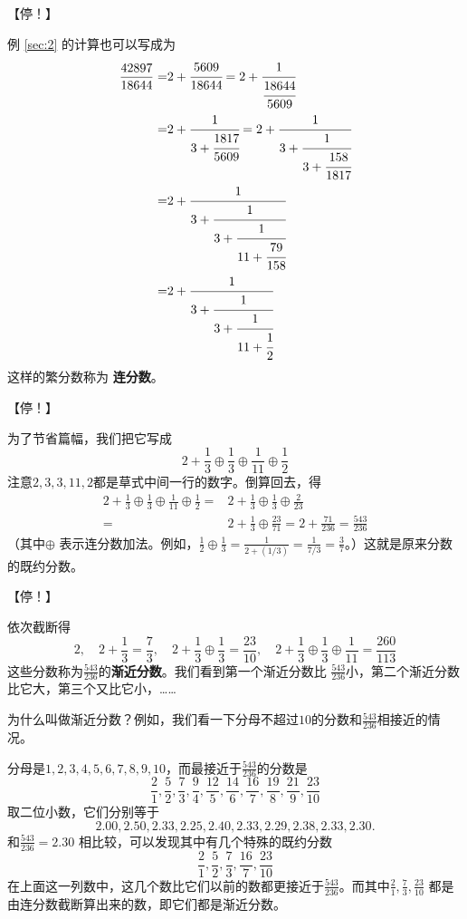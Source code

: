 \documentclass{ctexart}
\newcommand{\cplus}{\oplus}
\begin{document}
【停！】

例 \ref{sec:2} 的计算也可以写成为
\begin{align*}
  \frac{42897}{18644} = & 2 + \cfrac{5609}{18644} = 2 + \cfrac{1}{\cfrac{18644}{5609}}\\
  = & 2 + \cfrac{1}{3 + \cfrac{1817}{5609}} = 2 + \cfrac{1}{3+\cfrac{1}{3 + \cfrac{158}{1817}}}\\
  = & 2 + \cfrac{1}{3 + \cfrac{1}{3 + \cfrac{1}{11+\cfrac{79}{158}}}}\\
  = & 2 + \cfrac{1}{3 + \cfrac{1}{3 + \cfrac{1}{11+\cfrac{1}{2}}}}
\end{align*}
这样的繁分数称为 \textbf{连分数}。

【停！】

为了节省篇幅，我们把它写成
\begin{equation*}
2 + \frac{1}{3} \cplus \frac{1}{3} \cplus \frac{1}{11} \cplus \frac{1}{2}
\end{equation*}
注意$2,3,3,11,2$都是草式中间一行的数字。倒算回去，得
\begin{align*}
  2 + \frac{1}{3} \cplus \frac{1}{3} \cplus \frac{1}{11} \cplus \frac{1}{2} = & 2 + \frac{1}{3} \cplus \frac{1}{3} \cplus \frac{2}{23}\\
  = & 2 + \frac{1}{3} \cplus \frac{23}{71} = 2 + \frac{71}{236} = \frac{543}{236}
\end{align*}
（其中$\oplus$ 表示连分数加法。例如，$\frac{1}{2}\oplus \frac{1}{3} = \frac{1}{2 + (1/3)} = \frac{1}{7/3} = \frac{3}{7}$。）这就是原来分数的既约分数。

【停！】

依次截断得
$$
2,\quad 2+ \frac{1}{3} = \frac{7}{3}, \quad 2 + \frac{1}{3} \cplus \frac{1}{3} = \frac{23}{10}, \quad 2 + \frac{1}{3} \cplus \frac{1}{3} \cplus \frac{1}{11} = \frac{260}{113} 
$$
这些分数称为$\frac{543}{236}$的\textbf{渐近分数}。我们看到第一个渐近分数比 $\frac{543}{236}$小，第二个渐近分数比它大，第三个又比它小，……

为什么叫做渐近分数？例如，我们看一下分母不超过$10$的分数和$\frac{543}{236}$相接近的情况。

分母是$1,2,3,4,5,6,7,8,9,10$，而最接近于$\frac{543}{236}$的分数是
\begin{equation*}
\frac{2}{1}, \frac{5}{2}, \frac{7}{3}, \frac{9}{4}, \frac{12}{5}, \frac{14}{6}, \frac{16}{7}, \frac{19}{8}, \frac{21}{9}, \frac{23}{10}
\end{equation*}
取二位小数，它们分别等于
\begin{equation*}
2.00, 2.50, 2.33, 2.25, 2.40, 2.33, 2.29, 2.38, 2.33, 2.30.
\end{equation*}
和$\frac{543}{236} = 2.30$ 相比较，可以发现其中有几个特殊的既约分数
\begin{equation*}
\frac{2}{1}, \frac{5}{2}, \frac{7}{3}, \frac{16}{7}, \frac{23}{10}
\end{equation*}
在上面这一列数中，这几个数比它们以前的数都更接近于$\frac{543}{236}$。而其中$\frac{2}{1}, \frac{7}{3}, \frac{23}{10}$ 都是由连分数截断算出来的数，即它们都是渐近分数。
\end{document}
